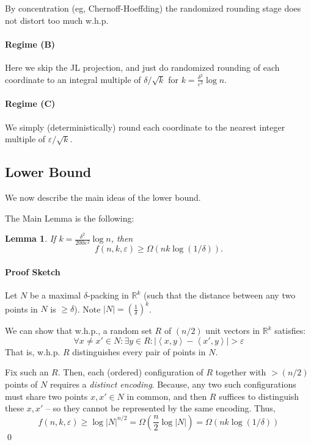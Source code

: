 \documentclass[11pt]{article}
\newcommand{\eps}{\varepsilon}
\newcommand{\innp}[1]{\left\langle #1 \right\rangle}
\newcommand{\R}{\mathbb{R}}
\newcommand{\1}{\mathbbm{1}}
\newtheorem{lemma}[theorem]{Lemma}
\begin{document}
By concentration (eg, Chernoff-Hoeffding) the randomized rounding
stage does not distort too much w.h.p.

\paragraph{Regime (B)}
Here we skip the JL projection, and just do randomized rounding
of each coordinate to an integral multiple of $\delta/\sqrt{k}$
for $k = \frac{\delta^2}{\eps^2}\log n$.

\paragraph{Regime (C)}
We simply (deterministically) round each coordinate to the nearest integer multiple of
$\eps/\sqrt{k}$.

\subsection{Lower Bound}
We now describe the main ideas of the lower bound.

The Main Lemma is the following:
\begin{lemma}
    If $k = \frac{\delta^2}{200 \eps^2} \log n$,
    then
    $$f(n, k, \eps) \geq \Omega(n k \log(1/\delta)).$$
\end{lemma}

\paragraph{Proof Sketch}
Let $N$ be a maximal $\delta$-packing in $\R^k$ (such that the distance between any two
points in $N$ is $\geq \delta$).
Note $|N| = (\frac{1}{\delta})^k$.

We can show that w.h.p., a random set $R$ of $(n/2)$ unit vectors in $\R^k$
satisfies:
$$\forall x \neq x' \in N: \exists y \in R: |\innp{x, y} - \innp{x', y}| >
\eps$$
That is, w.h.p. $R$ distinguishes every pair of points in $N$.

Fix such an $R$. Then, each (ordered) configuration of
$R$ together with $> (n/2)$ points of $N$ requires a \emph{distinct encoding}.
Because, any two such configurations must share two points $x, x' \in N$ in common,
and then $R$ suffices to distinguish these $x, x'$ -- so they cannot be
represented by the same encoding.
Thus,
$$f(n, k, \eps) \geq \log |N|^{n/2} = \Omega(\frac{n}{2} \log |N|) = \Omega( nk
\log(1/\delta))$$
\qed




\end{document}
